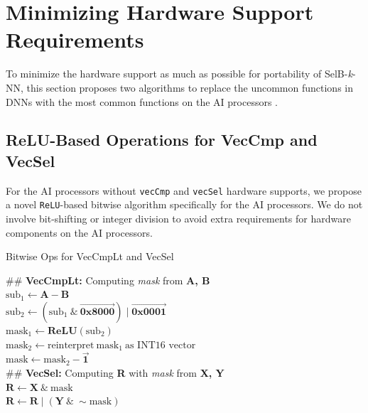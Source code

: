 \section{Minimizing Hardware Support Requirements}

To minimize the hardware support as much as possible for portability of SelB-\textit{k}-NN, this section proposes two algorithms to replace the uncommon functions in DNNs with the most common functions on the AI processors \cite{cambricon, CANN, jax}.

\subsection{ReLU-Based Operations for VecCmp and VecSel \label{sec:relu}}

For the AI processors without \verb|vecCmp| and \verb|vecSel| hardware supports, we propose a novel \verb|ReLU|-based bitwise algorithm specifically for the AI processors. We do not involve bit-shifting or integer division to avoid extra requirements for hardware components on the AI processors.
    
\begin{algorithm}[tbp]
    \caption{Bitwise Ops for VecCmpLt and VecSel}
    \label{alg:bit_hack}
            
            
                
    \BlankLine
    \#\# \textbf{VecCmpLt:} Computing \textit{mask} from \textbf{A, B} \\
    $\text{sub}_{1} \leftarrow \textbf{A} - \textbf{B}$ \\
    $\text{sub}_{2} \leftarrow (\text{sub}_{1} \  \& \  \vec{\textbf{0x8000}}) \mid \vec{\textbf{0x0001}}$ \\
    $\text{mask}_{1} \leftarrow \textbf{ReLU}(\text{sub}_{2})$ \\
    $\text{mask}_{2} \leftarrow \text{reinterpret} \  \text{mask}_{1} \  \text{as INT16 vector}$ \\
    $\text{mask} \leftarrow \text{mask}_{2} - \vec{\textbf{1}}$ \\
    
    \BlankLine
    \#\# \textbf{VecSel:} Computing \textbf{R} with \textit{mask} from \textbf{X, Y}\\
    $\textbf{R} \leftarrow \textbf{X} \ \&\ \text{mask}$ \\
    $\textbf{R} \leftarrow \textbf{R} \mid (\textbf{Y} \ \&\ \sim \text{mask})$ \\
\end{algorithm}
    
